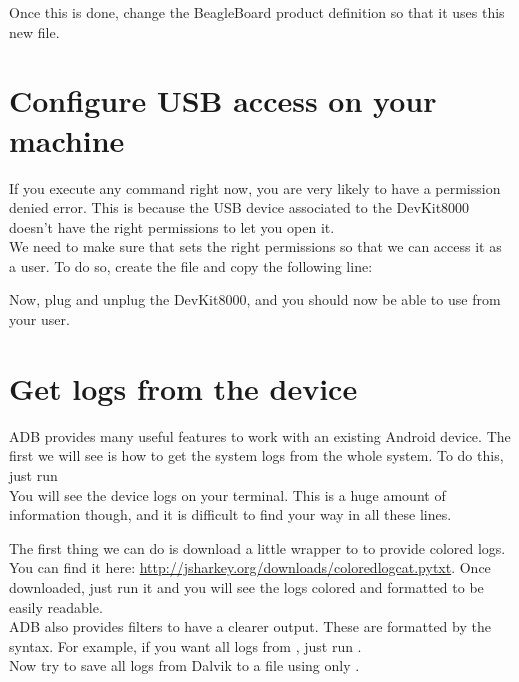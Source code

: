 Once this is done, change the BeagleBoard product definition so that
it uses this new file.

\section{Configure USB access on your machine}

If you execute any command right now, you are very likely to have a
permission denied error. This is because the USB device associated to
the DevKit8000 doesn't have the right permissions to let you open it.\\

We need to make sure that  sets the right permissions so that we can access
it as a user. To do so, create the file
 and copy the following line:


Now, plug and unplug the DevKit8000, and you should now be able to use
 from your user.

\section{Get logs from the device}

ADB provides many useful features to work with an existing Android device.
The first we will see is how to get the system logs from the whole system. To do
this, just run \\

You will see the device logs on your terminal. This is a huge amount of
information though, and it is difficult to find your way in all these lines.

The first thing we can do is download a little wrapper to  to provide colored
logs. You can find it here: \url{http://jsharkey.org/downloads/coloredlogcat.pytxt}. Once downloaded, just run it and you will see the logs colored and
formatted to be easily readable.\\

ADB also provides filters to have a clearer output. These are formatted by the
 syntax. For example, if you want all logs from ,
just run .\\

Now try to save all logs from Dalvik to a file using only .

